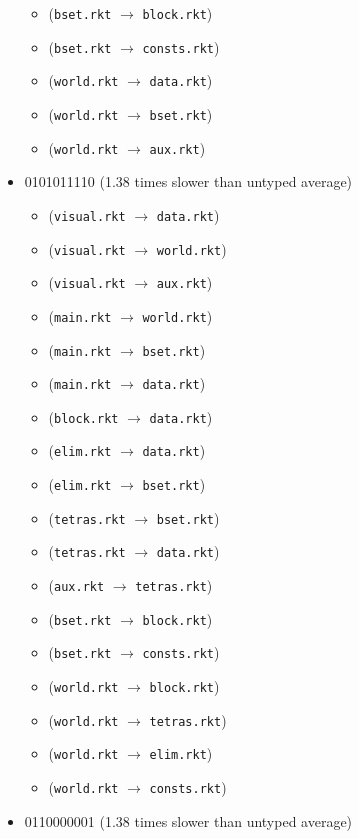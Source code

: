 \documentclass{article}
\newcommand{\mono}[1]{\texttt{#1}}
\begin{document}
\begin{itemize}
\begin{itemize}
  \item (\mono{bset.rkt} $\rightarrow$ \mono{block.rkt})
  \item (\mono{bset.rkt} $\rightarrow$ \mono{consts.rkt})
  \item (\mono{world.rkt} $\rightarrow$ \mono{data.rkt})
  \item (\mono{world.rkt} $\rightarrow$ \mono{bset.rkt})
  \item (\mono{world.rkt} $\rightarrow$ \mono{aux.rkt})
  \end{itemize}
\item 0101011110 (1.38 times slower than untyped average)
  \begin{itemize}
  \item (\mono{visual.rkt} $\rightarrow$ \mono{data.rkt})
  \item (\mono{visual.rkt} $\rightarrow$ \mono{world.rkt})
  \item (\mono{visual.rkt} $\rightarrow$ \mono{aux.rkt})
  \item (\mono{main.rkt} $\rightarrow$ \mono{world.rkt})
  \item (\mono{main.rkt} $\rightarrow$ \mono{bset.rkt})
  \item (\mono{main.rkt} $\rightarrow$ \mono{data.rkt})
  \item (\mono{block.rkt} $\rightarrow$ \mono{data.rkt})
  \item (\mono{elim.rkt} $\rightarrow$ \mono{data.rkt})
  \item (\mono{elim.rkt} $\rightarrow$ \mono{bset.rkt})
  \item (\mono{tetras.rkt} $\rightarrow$ \mono{bset.rkt})
  \item (\mono{tetras.rkt} $\rightarrow$ \mono{data.rkt})
  \item (\mono{aux.rkt} $\rightarrow$ \mono{tetras.rkt})
  \item (\mono{bset.rkt} $\rightarrow$ \mono{block.rkt})
  \item (\mono{bset.rkt} $\rightarrow$ \mono{consts.rkt})
  \item (\mono{world.rkt} $\rightarrow$ \mono{block.rkt})
  \item (\mono{world.rkt} $\rightarrow$ \mono{tetras.rkt})
  \item (\mono{world.rkt} $\rightarrow$ \mono{elim.rkt})
  \item (\mono{world.rkt} $\rightarrow$ \mono{consts.rkt})
  \end{itemize}
\item 0110000001 (1.38 times slower than untyped average)

\end{itemize}
\end{document}
